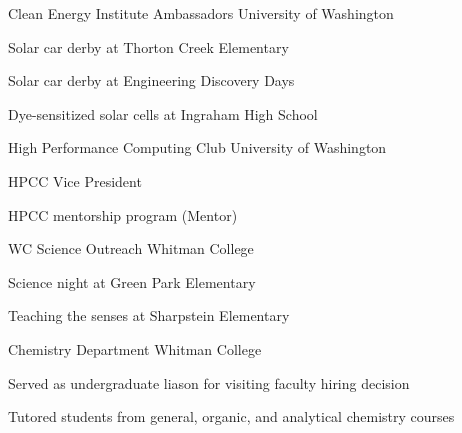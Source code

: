 


\begin{cventries}

\cventry
  {}
  {Clean Energy Institute Ambassadors} %
  {University of Washington} %
  {}
  {
    \begin{cvitems}
      \item{Solar car derby at Thorton Creek Elementary}
      \item{Solar car derby at Engineering Discovery Days}
      \item{Dye-sensitized solar cells at Ingraham High School}
    \end{cvitems}
  }

\cventry
  {}
  {High Performance Computing Club} %
  {University of Washington} %
  {}
  {
    \begin{cvitems}
	  \item{HPCC Vice President}
      \item{HPCC mentorship program (Mentor)}
    \end{cvitems}
  }
   
\cventry
  {}
  {WC Science Outreach} %
  {Whitman College} %
  {}
  {
    \begin{cvitems}
      \item{Science night at Green Park Elementary}
      \item{Teaching the senses at Sharpstein Elementary}
    \end{cvitems}
  }

\cventry
  {}
  {Chemistry Department} %
  {Whitman College} %
  {}
  {
    \begin{cvitems}
      \item{Served as undergraduate liason for visiting faculty hiring decision}
      \item{Tutored students from general, organic, and analytical chemistry courses}
    \end{cvitems}
  }

\end{cventries}
